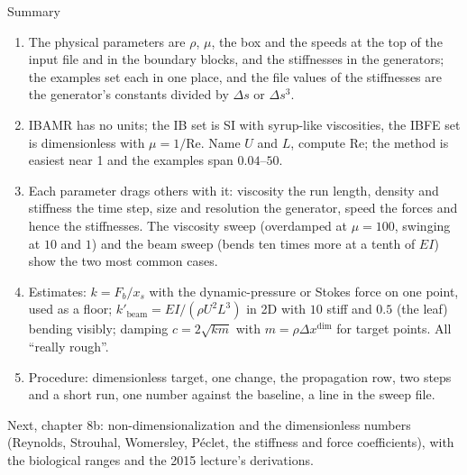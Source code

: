 \documentclass[aspectratio=169,11pt]{beamer}
\begin{document}
\begin{frame}{Summary}
\label{fr:summary}
\footnotesize
\begin{enumerate}
  \item The physical parameters are $\rho$, $\mu$, the box and the speeds at the top of the input file and in the boundary blocks, and the stiffnesses in the generators; the examples set each in one place, and the file values of the stiffnesses are the generator's constants divided by $\Delta s$ or $\Delta s^3$.
  \item IBAMR has no units; the IB set is SI with syrup-like viscosities, the IBFE set is dimensionless with $\mu = 1/\mathrm{Re}$. Name $U$ and $L$, compute $\mathrm{Re}$; the method is easiest near 1 and the examples span $0.04$--$50$.
  \item Each parameter drags others with it: viscosity the run length, density and stiffness the time step, size and resolution the generator, speed the forces and hence the stiffnesses. The viscosity sweep (overdamped at $\mu = 100$, swinging at $10$ and $1$) and the beam sweep (bends ten times more at a tenth of $EI$) show the two most common cases.
  \item Estimates: $k = F_b/x_s$ with the dynamic-pressure or Stokes force on one point, used as a floor; $k'_{\mathrm{beam}} = EI/(\rho U^2L^3)$ in 2D with $10$ stiff and $0.5$ (the leaf) bending visibly; damping $c = 2\sqrt{km}$ with $m = \rho\Delta x^{\mathrm{dim}}$ for target points. All ``really rough''.
  \item Procedure: dimensionless target, one change, the propagation row, two steps and a short run, one number against the baseline, a line in the sweep file.
\end{enumerate}
\vspace{1mm}
\begin{homebox}
\footnotesize Next, chapter 8b: non-dimensionalization and the dimensionless numbers (Reynolds, Strouhal, Womersley, P\'eclet, the stiffness and force coefficients), with the biological ranges and the 2015 lecture's derivations.
\end{homebox}
\end{frame}
\end{document}
